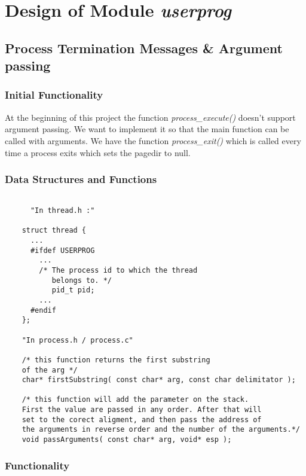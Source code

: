 \chapter{Design of Module \textit{userprog}}


\section{Process Termination Messages \& Argument passing}

    \subsection{Initial Functionality}

	At the beginning of this project the function \textit{process\_execute()} doesn't support argument passing. We want to implement it so that the main function can be called with arguments.
	We have the function \textit{process\_exit()} which is called every time a process exits which sets the pagedir to null.

    \subsection{Data Structures and Functions}

    \begin{lstlisting}

      "In thread.h :"
	
	struct thread {
	  ...
	  #ifdef USERPROG
	    ...
	    /* The process id to which the thread
	       belongs to. */
	       pid_t pid;
	    ...
	  #endif
	};

	"In process.h / process.c"

	/* this function returns the first substring 
	of the arg */
	char* firstSubstring( const char* arg, const char delimitator );

	/* this function will add the parameter on the stack.
	First the value are passed in any order. After that will 
	set to the corect aligment, and then pass the address of
	the arguments in reverse order and the number of the arguments.*/
	void passArguments( const char* arg, void* esp );

    \end{lstlisting}


    \subsection{Functionality}

